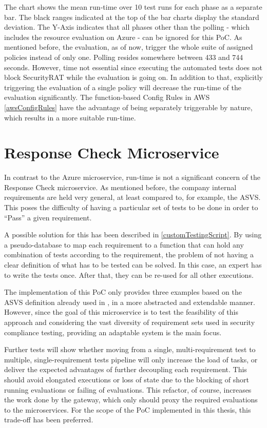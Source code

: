 The chart shows the mean run-time over 10 test runs for each phase as a separate bar. The black ranges indicated at the top of the bar charts display the standard deviation.
The Y-Axis indicates that all phases other than the polling - which includes the resource evaluation on Azure - can be ignored for this PoC. As mentioned before, the evaluation, as of now, trigger the whole suite of assigned policies instead of only one. Polling resides somewhere between 433 and 744 seconds. However, time not essential since executing the automated tests does not block SecurityRAT while the evaluation is going on.
In addition to that, explicitly triggering the evaluation of a single policy will decrease the run-time of the evaluation significantly. The function-based Config Rules in AWS \ref{awsConfigRules} have the advantage of being separately triggerable by nature, which results in a more suitable run-time.


\section{Response Check Microservice}
\label{refResponseCheckMS}
In contrast to the Azure microservice, run-time is not a significant concern of the Response Check microservice. As mentioned before, the company internal requirements are held very general, at least compared to, for example, the ASVS. This poses the difficulty of having a particular set of tests to be done in order to \enquote{Pass} a given requirement.

A possible solution for this has been described in \ref{customTestingScript}. By using a pseudo-database to map each requirement to a function that can hold any combination of tests according to the requirement, the problem of not having a clear definition of what has to be tested can be solved. In this case, an expert has to write the tests once. After that, they can be re-used for all other executions.

The implementation of this PoC only provides three examples based on the ASVS definition already used in \citep{secCat2020}, in a more abstracted and extendable manner. However, since the goal of this microservice is to test the feasibility of this approach and considering the vast diversity of requirement sets used in security compliance testing, providing an adaptable system is the main focus.

Further tests will show whether moving from a single, multi-requirement test to multiple, single-requirement tests pipeline will only increase the load of tasks, or deliver the expected advantages of further decoupling each requirement. This should avoid elongated executions or loss of state due to the blocking of short running evaluations or failing of evaluations. This refactor, of course, increases the work done by the gateway, which only should proxy the required evaluations to the microservices. For the scope of the PoC implemented in this thesis, this trade-off has been preferred.


